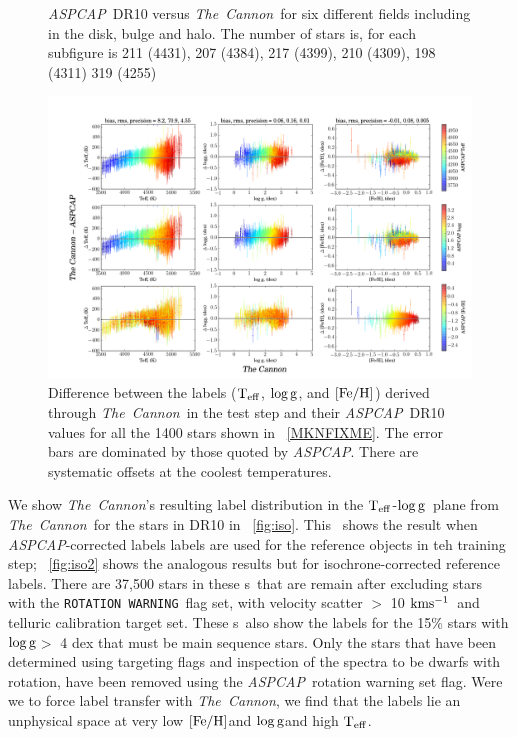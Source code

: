\documentclass[12pt, preprint]{aastex}
\newcommand{\figurenames}{\figurename s}
\newcommand{\tc}{\textsl{The~Cannon}}
\newcommand{\aspcap}{\textsl{ASPCAP}}
\newcommand{\rotwarn}{\texttt{ROTATION WARNING}}
\newcommand{\teff}{\mbox{$\rm T_{eff}$}}
\newcommand{\kms}{\mbox{$\rm kms^{-1}$}}
\newcommand{\feh}{\mbox{$\rm [Fe/H]$}}
\newcommand{\logg}{\mbox{$\rm \log g$}}
\begin{document}
\begin{figure}[!h]
\caption{\small{\aspcap\ DR10 versus \tc\ for six different fields including in the disk, bulge and halo. The number of stars is, for each subfigure is 211 (4431), 207 (4384), 217 (4399), 210 (4309), 198 (4311) 319 (4255) }}
\label{fig:cal}
\end{figure}

\begin{figure}[!h]
\centering
        \includegraphics[scale=0.35]{./plots/cplot2.png} 
\caption{Difference between the labels (\teff, \logg, and \feh) derived through \tc\ in the test step and their \aspcap\ DR10 values for all the 1400 stars shown in \figurename~\ref{MKNFIXME}. The error bars are dominated by those quoted by \aspcap. There are systematic offsets at the coolest temperatures.}
\label{fig:cplot}
\end{figure}


We show \tc 's resulting label distribution in the \teff-\logg\ plane from \tc\ for the stars in DR10 in \figurename~\ref{fig:iso}. 
This \figurename\ shows the result when \aspcap -corrected labels labels are used for the reference objects in teh training step; \figurename~\ref{fig:iso2} shows the analogous results but for isochrone-corrected reference labels. There are 37,500 stars in these \figurenames\ that are remain after excluding stars with the \rotwarn\ flag set, with velocity scatter $>$ 10 \kms\ and telluric calibration target set. These \figurenames\ also show the labels for the 15\% stars with \logg $>$ 4 dex that must be main sequence stars.
 Only the stars that have been determined using targeting flags and inspection of the spectra to be dwarfs with rotation, 
 have been removed using the \aspcap\ rotation warning set flag. 
 Were we to force label transfer with \tc , we find that the labels lie an unphysical space at very low \feh and \logg and high \teff.
\end{document}
